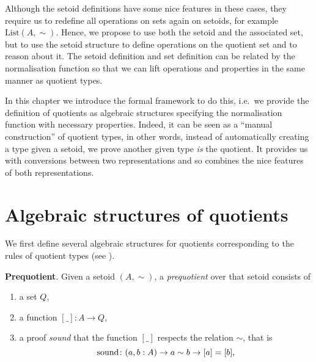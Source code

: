 Although the setoid definitions have some nice features in these cases, they require us to redefine all operations on sets again on setoids, for example $\text{List} (A,\sim)$.
Hence, we propose to use both the setoid
and the associated set, but to use the setoid structure to define
operations on the quotient set and to reason about it. 
The setoid definition and set definition can be related by the normalisation function so that we can lift operations and properties in the same manner as quotient types.



In this chapter we introduce the formal framework to do this, i.e.\ we provide the definition of quotients as algebraic structures specifying the normalisation function with necessary properties. Indeed, it can be seen as a ``manual construction'' of quotient types, in other words,
instead of automatically creating a type given a setoid, we
prove another given type \emph{is} the quotient.
It provides us with conversions between two representations and so combines the nice features of both representations. 



\section{Algebraic structures of quotients}

We first define several algebraic structures for quotients corresponding to the rules of quotient types (see ).

\begin{definition}
\textbf{Prequotient}.
\noindent
Given a setoid $(A,\sim)$,  a \emph{prequotient} over that setoid consists of
\begin{enumerate}
\item \label{enum:Q} a set $Q$,
\item \label{enum:box}a function $[\_]: A \rightarrow Q$,
\item \label{enum:sound} a proof \emph{sound} that the function $[\_]$ respects the relation $\sim$,
that is \[\operatorname{sound}\colon (a,b : A) \rightarrow a\sim b \rightarrow [a] = [b],\]
\end{enumerate}
\end{definition}

